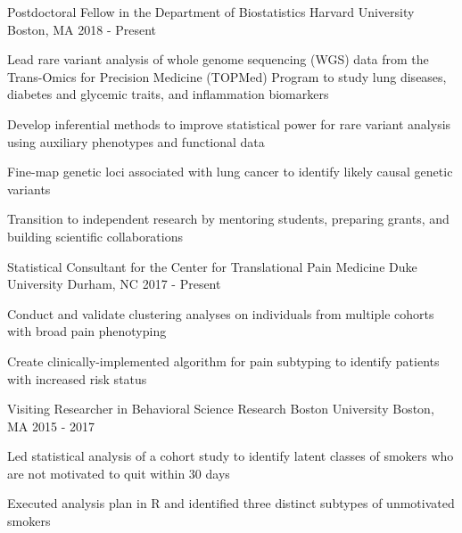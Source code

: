 

\begin{cventries}
\cventry
{Postdoctoral Fellow in the Department of Biostatistics} %
{Harvard University} %
{Boston, MA} %
{2018 - Present} %
{
	\begin{cvitems} %
		\item {Lead rare variant analysis of whole genome sequencing (WGS) data from the Trans-Omics for Precision Medicine (TOPMed) Program to study lung diseases, diabetes and glycemic traits, and inflammation biomarkers}
		\item {Develop inferential methods to improve statistical power for rare variant analysis using auxiliary phenotypes and functional data}
		\item {Fine-map genetic loci associated with lung cancer to identify likely causal genetic variants}
		\item {Transition to independent research by mentoring students, preparing grants, and building scientific collaborations}
	\end{cvitems}
}


  \cventry
    {Statistical Consultant for the Center for Translational Pain Medicine} %
    {Duke University} %
    {Durham, NC} %
    {2017 - Present} %
    {
      \begin{cvitems} %
        \item {Conduct and validate clustering analyses on individuals from multiple cohorts with broad pain phenotyping}
        \item {Create clinically-implemented algorithm for pain subtyping to identify patients with increased risk status}
      \end{cvitems}
    }

  \cventry
    {Visiting Researcher in Behavioral Science Research} %
    {Boston University} %
    {Boston, MA} %
    {2015 - 2017} %
    {
      \begin{cvitems} %
        \item {Led statistical analysis of a cohort study to identify latent classes of smokers who are not motivated to quit within 30 days}
        \item {Executed analysis plan in R and identified three distinct subtypes of unmotivated smokers}
      \end{cvitems}
    }


\end{cventries}
